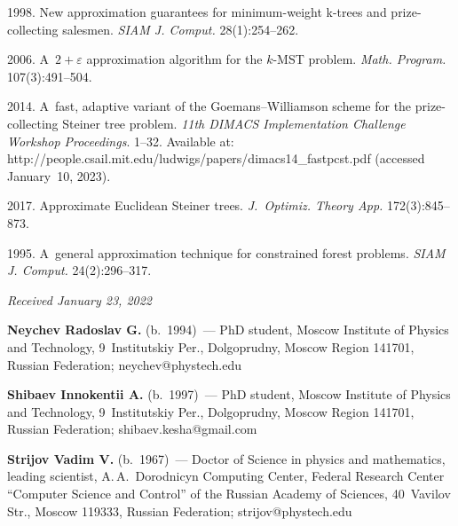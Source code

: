 \begin{multicols}{2}
{{\begin{thebibliography}{99}
 1998. New approximation guarantees for minimum-weight \mbox{k-trees} and prize-collecting salesmen.
 \textit{SIAM J. Comput.} 28(1):254--262.

 2006. A~$2+\varepsilon$ approximation algorithm for the $k$-MST problem. 
\textit{Math. Program.} 107(3):491--504.

 2014. 
A~fast, adaptive variant of the Goemans--Williamson scheme for the prize-collecting Steiner tree problem. 
\textit{11th DIMACS Implementation Challenge Workshop Proceedings}. 1--32.
Available at: 
{\sf http://people.csail.mit.edu/ludwigs/papers/\linebreak dimacs14\_fastpcst.pdf} (accessed January~10, 2023).

2017. Approximate Euclidean Steiner trees. \textit{J.~Optimiz. Theory  App.} 172(3):845--873.

 1995. 
A~general approximation technique for constrained forest problems. \textit{SIAM J. Comput.} 24(2):296--317.
 \end{thebibliography}

 }
 }

\end{multicols}

\vspace*{-6pt}

\hfill{\small\textit{Received January 23, 2022}}

\Contr

\noindent
\textbf{Neychev Radoslav G.} (b.\ 1994)~--- 
PhD student, Moscow Institute of Physics and Technology, 9~Institutskiy Per., Dolgoprudny, Moscow Region 141701, Russian Federation;
\mbox{neychev@phystech.edu}

\vspace*{3pt}

\noindent
\textbf{Shibaev Innokentii A.} (b.\ 1997)~--- 
PhD student, Moscow Institute of Physics and Technology, 9~Institutskiy Per., Dolgoprudny, Moscow Region 141701, Russian Federation; 
\mbox{shibaev.kesha@gmail.com}

\vspace*{3pt}

\noindent
\textbf{Strijov Vadim V.} (b.\ 1967)~--- 
Doctor of Science in physics and mathematics, leading scientist, A.\,A.~Dorodnicyn Computing Center, 
Federal Research Center ``Computer Science and Control'' of the Russian Academy of Sciences, 40~Vavilov Str., Moscow 119333, Russian Federation;
\mbox{strijov@phystech.edu}


\label{end\stat}

\renewcommand{\bibname}{\protect\rm Литература} 